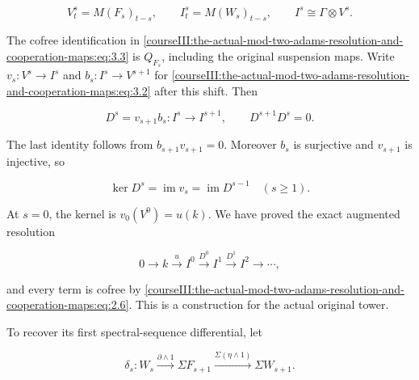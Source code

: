 \begin{equation}
V^s_t=M(F_s)_{t-s},\qquad
 I^s_t=M(W_s)_{t-s},\qquad
 I^s\cong\Gamma\otimes V^s.
 \label{courseIII:the-actual-mod-two-adams-resolution-and-cooperation-maps:eq:3.3}
\end{equation}

The cofree identification in \eqref{courseIII:the-actual-mod-two-adams-resolution-and-cooperation-maps:eq:3.3} is \(Q_{F_s}\), including the original suspension maps. Write \(v_s:V^s\to I^s\) and \(b_s:I^s\to V^{s+1}\) for \eqref{courseIII:the-actual-mod-two-adams-resolution-and-cooperation-maps:eq:3.2} after this shift. Then

\begin{equation}
D^s=v_{s+1}b_s:I^s\longrightarrow I^{s+1},
 \qquad D^{s+1}D^s=0.
 \label{courseIII:the-actual-mod-two-adams-resolution-and-cooperation-maps:eq:3.4}
\end{equation}

The last identity follows from \(b_{s+1}v_{s+1}=0\). Moreover \(b_s\) is surjective and \(v_{s+1}\) is injective, so

\begin{equation}
\ker D^s=\operatorname{im}v_s
           =\operatorname{im}D^{s-1}\quad(s\geq1).
 \label{courseIII:the-actual-mod-two-adams-resolution-and-cooperation-maps:eq:3.5}
\end{equation}

At \(s=0\), the kernel is \(v_0(V^0)=u(k)\). We have proved the exact augmented resolution

\begin{equation}
0\longrightarrow k\xrightarrow{u}I^0
 \xrightarrow{D^0}I^1\xrightarrow{D^1}I^2\longrightarrow\cdots,
 \label{courseIII:the-actual-mod-two-adams-resolution-and-cooperation-maps:eq:3.6}
\end{equation}

and every term is cofree by \eqref{courseIII:the-actual-mod-two-adams-resolution-and-cooperation-maps:eq:2.6}. This is a construction for the actual original tower.

To recover its first spectral-sequence differential, let

\begin{equation}
\delta_s:W_s\xrightarrow{\partial\wedge1}\Sigma F_{s+1}
                 \xrightarrow{\Sigma(\eta\wedge1)}\Sigma W_{s+1}.
 \label{courseIII:the-actual-mod-two-adams-resolution-and-cooperation-maps:eq:3.7}
\end{equation}

